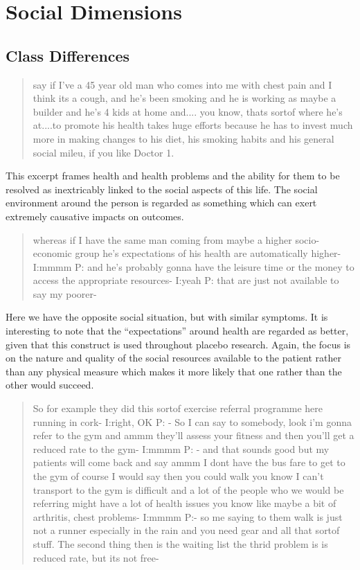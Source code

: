 \section{Social Dimensions}
\label{sec:social-dimensions}

\subsection{Class Differences}
\label{sec:class-differences}

\begin{quotation}
 say if I've a 45 year old man who comes into me with chest pain and I think its a cough, and he's been smoking and he is working as maybe a builder and he's 4 kids at home and.... you know, thats sortof where he's at....to promote his health takes huge efforts because he has to invest much more in making changes to his diet, his smoking habits and his general social mileu, if you like
Doctor 1.  
\end{quotation}

This excerpt frames health and health problems and the ability for them to be resolved as inextricably linked to the social aspects of this life. The social environment around the person is regarded as something which can exert extremely causative impacts on outcomes. 

\begin{quotation}
  whereas if I have the same man coming from maybe a higher socio-economic group he's expectations of his health are automatically higher-
I:mmmm
P: and he's probably gonna have the leisure time or the money to access the appropriate resources-
I:yeah
P: that are just not available to say my poorer-

\end{quotation}

Here we have the opposite social situation, but with similar symptoms. It is interesting to note that the ``expectations'' around health are regarded as better, given that this construct is used throughout placebo research. Again, the focus is on the nature and quality of the social resources available to the patient rather than any physical measure which makes it more likely that one rather than the other would succeed. 

\begin{quotation}
  So for example they did this sortof exercise referral programme here running in cork-
I:right, OK
P: - So I can say to somebody, look i'm gonna refer to the gym and ammm they'll assess your fitness  and then you'll get a reduced rate to the gym-
I:mmmm
P: - and that sounds good but my patients will come back and say ammm I dont have the bus fare to get to the gym of course I would say then you could walk you know I can't transport to the gym is difficult and a lot of the people who we would be referring might have a lot of health issues you know like maybe a bit of arthritis, chest problems-
I:mmmm
P:- so me saying to them walk is just not a runner especially in the rain and you need gear and all that sortof stuff. The second thing then is the waiting list the thrid problem is is reduced rate, but its not free-
\end{quotation}

